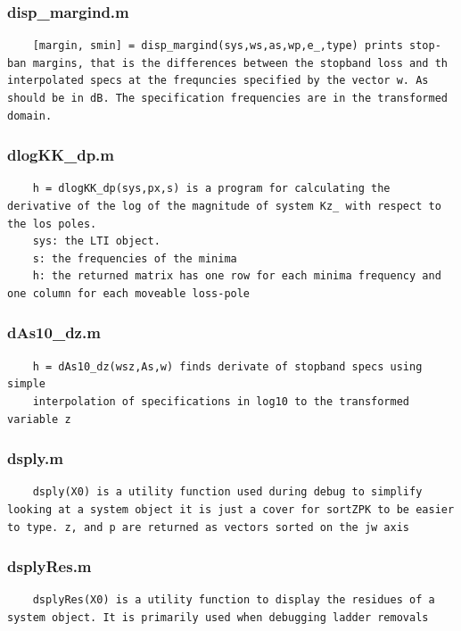 \documentclass[]{article}
\begin{document}
\subsubsection*{disp\_margind.m}
\begin{lstlisting}
    [margin, smin] = disp_margind(sys,ws,as,wp,e_,type) prints stop-ban margins, that is the differences between the stopband loss and th interpolated specs at the frequncies specified by the vector w. As should be in dB. The specification frequencies are in the transformed domain.
\end{lstlisting}

\subsubsection*{dlogKK\_dp.m}
\begin{lstlisting}
    h = dlogKK_dp(sys,px,s) is a program for calculating the derivative of the log of the magnitude of system Kz_ with respect to the los poles.
    sys: the LTI object.
    s: the frequencies of the minima
    h: the returned matrix has one row for each minima frequency and one column for each moveable loss-pole
\end{lstlisting}

\subsubsection*{dAs10\_dz.m}
\begin{lstlisting}
    h = dAs10_dz(wsz,As,w) finds derivate of stopband specs using simple
    interpolation of specifications in log10 to the transformed variable z
\end{lstlisting}

\subsubsection*{dsply.m}
\begin{lstlisting}
    dsply(X0) is a utility function used during debug to simplify looking at a system object it is just a cover for sortZPK to be easier to type. z, and p are returned as vectors sorted on the jw axis
\end{lstlisting}

\subsubsection*{dsplyRes.m}
\begin{lstlisting}
    dsplyRes(X0) is a utility function to display the residues of a system object. It is primarily used when debugging ladder removals
\end{lstlisting}
\end{document}
